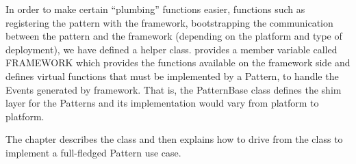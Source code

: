 


In order to make  certain ``plumbing'' functions easier, functions such as 
registering the pattern with the framework, bootstrapping the communication between the pattern and the framework (depending on the platform and type of deployment), we have defined a   helper class.
 provides a member variable called FRAMEWORK which provides the functions available on the framework side and defines virtual functions that must be implemented by a Pattern, to handle the Events generated by framework. That is, the PatternBase class defines the shim layer for the Patterns and its implementation would vary from platform to platform. 

The chapter describes the  class  and then explains how to drive from the  class to implement a full-fledged Pattern use case.


